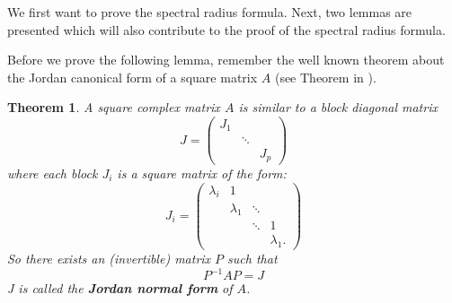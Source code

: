 \documentclass[a4paper,11pt]{report}
\newtheorem{theorem}{Theorem}[section]
\begin{document}
We first want to prove the spectral radius formula. Next, two lemmas are presented which will 
also contribute to the proof of the spectral radius formula. 


Before we prove the following lemma, remember the well known theorem about the 
Jordan canonical form of a square matrix $A$ (see Theorem in \cite{kieboom}). 
\begin{theorem}
  A square complex matrix $A$ is similar to a block diagonal matrix 
  $$ J = \begin{pmatrix}
  J_1 & & \\
  & \ddots & \\
  & & J_p
  \end{pmatrix}$$
  where each block $J_i$ is a square matrix of the form:
  $$J_i = \begin{pmatrix}
  \lambda_i & 1 & &\\
  & \lambda_1 & \ddots &\\
  & & \ddots & 1\\
  & & & \lambda_1.
  \end{pmatrix}$$
  So there exists an (invertible) matrix $P$ such that 
  $$P^{-1}AP = J$$
  J is called the \textbf{Jordan normal form}  of $A$.
  \end{theorem}
\end{document}
